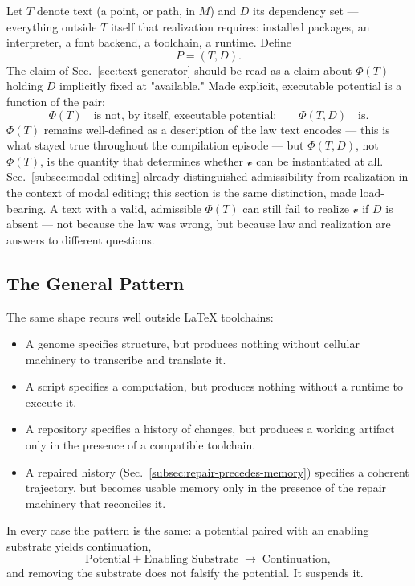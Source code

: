 \documentclass[12pt,a4paper]{article}
\theoremstyle{plain}
\theoremstyle{definition}
\theoremstyle{remark}
\newcommand{\Phifield}{\Phi}
\newcommand{\vfield}{\mathcal{v}}
\begin{document}
Let $T$ denote text (a point, or path, in $M$) and $D$ its dependency set — everything outside $T$ itself that realization requires: installed packages, an interpreter, a font backend, a toolchain, a runtime. Define
\[
P = (T, D).
\]
The claim of Sec.~\ref{sec:text-generator} should be read as a claim about $\Phifield(T)$ holding $D$ implicitly fixed at "available." Made explicit, executable potential is a function of the pair:
\[
\Phifield(T) \quad \text{is not, by itself, executable potential;} \qquad \Phifield(T, D) \quad \text{is.}
\]
$\Phifield(T)$ remains well-defined as a description of the law text encodes — this is what stayed true throughout the compilation episode — but $\Phifield(T,D)$, not $\Phifield(T)$, is the quantity that determines whether $\vfield$ can be instantiated at all. Sec.~\ref{subsec:modal-editing} already distinguished admissibility from realization in the context of modal editing; this section is the same distinction, made load-bearing. A text with a valid, admissible $\Phifield(T)$ can still fail to realize $\vfield$ if $D$ is absent — not because the law was wrong, but because law and realization are answers to different questions.

\subsection{The General Pattern}
\label{subsec:dependency-general-pattern}

The same shape recurs well outside LaTeX toolchains:
\begin{itemize}
  \item A genome specifies structure, but produces nothing without cellular machinery to transcribe and translate it.
  \item A script specifies a computation, but produces nothing without a runtime to execute it.
  \item A repository specifies a history of changes, but produces a working artifact only in the presence of a compatible toolchain.
  \item A repaired history (Sec.~\ref{subsec:repair-precedes-memory}) specifies a coherent trajectory, but becomes usable memory only in the presence of the repair machinery that reconciles it.
\end{itemize}
In every case the pattern is the same: a potential paired with an enabling substrate yields continuation,
\[
\text{Potential} + \text{Enabling Substrate} \;\longrightarrow\; \text{Continuation},
\]
and removing the substrate does not falsify the potential. It suspends it.
\end{document}
